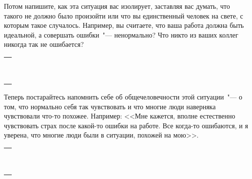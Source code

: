 \begin{itemize}
	\itemWritingHand Потом напишите, как эта ситуация вас изолирует, заставляя вас думать, что такого не должно было произойти или что вы единственный человек на свете, с которым такое случалось. Например, вы считаете, что ваша работа должна быть идеальной, а совершать ошибки~"--- ненормально? Что никто из ваших коллег никогда так не ошибается?
\end{itemize}

\setlength{\extrarowheight}{2mm}
\begin{tabularx}{\textwidth}{X}
	\\
	\arrayrulecolor{gray}\hline\\
	\hline\\
	\hline\\
	\hline\\
	\hline\\
	\hline\\
	\hline\\
	\hline\\
	\hline\\
	\hline\\	
\end{tabularx}
\setlength{\extrarowheight}{0mm}

\begin{itemize}
	\itemWritingHand Теперь постарайтесь напомнить себе об общечеловечности этой ситуации~"--- о том, что нормально себя так чувствовать и что многие люди наверняка чувствовали что-то похожее. Например: <<Мне кажется, вполне естественно чувствовать страх после какой-то ошибки на работе. Все когда-то ошибаются, и я уверена, что многие люди были в ситуации, похожей на мою>>.
\end{itemize}

\setlength{\extrarowheight}{2mm}
\begin{tabularx}{\textwidth}{X}
	\\
	\arrayrulecolor{gray}\hline\\
	\hline\\
	\hline\\
	\hline\\
	\hline\\
	\hline\\
	\hline\\
	\hline\\
	\hline\\
	\hline\\	
\end{tabularx}
\setlength{\extrarowheight}{0mm}

